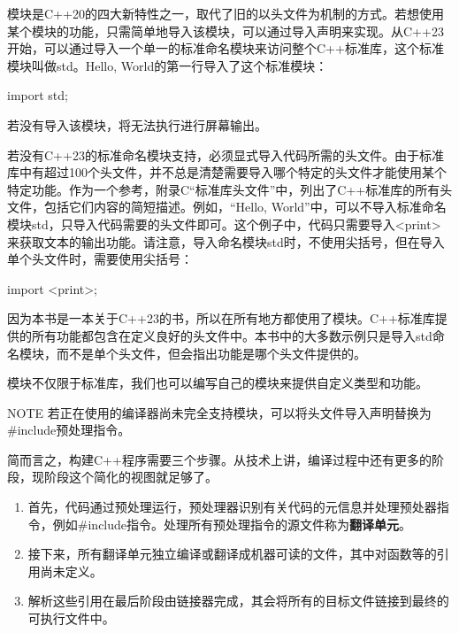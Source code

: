 
模块是C++20的四大新特性之一，取代了旧的以头文件为机制的方式。若想使用某个模块的功能，只需简单地导入该模块，可以通过导入声明来实现。从C++23开始，可以通过导入一个单一的标准命名模块来访问整个C++标准库，这个标准模块叫做std。Hello, World的第一行导入了这个标准模块：

\begin{cpp}
import std;
\end{cpp}

若没有导入该模块，将无法执行进行屏幕输出。

若没有C++23的标准命名模块支持，必须显式导入代码所需的头文件。由于标准库中有超过100个头文件，并不总是清楚需要导入哪个特定的头文件才能使用某个特定功能。作为一个参考，附录C“标准库头文件”中，列出了C++标准库的所有头文件，包括它们内容的简短描述。例如，“Hello, World”中，可以不导入标准命名模块std，只导入代码需要的头文件即可。这个例子中，代码只需要导入<print>来获取文本的输出功能。请注意，导入命名模块std时，不使用尖括号，但在导入单个头文件时，需要使用尖括号：

\begin{cpp}
import <print>;
\end{cpp}

因为本书是一本关于C++23的书，所以在所有地方都使用了模块。C++标准库提供的所有功能都包含在定义良好的头文件中。本书中的大多数示例只是导入std命名模块，而不是单个头文件，但会指出功能是哪个头文件提供的。

模块不仅限于标准库，我们也可以编写自己的模块来提供自定义类型和功能。

\begin{myNotic}{NOTE}
若正在使用的编译器尚未完全支持模块，可以将头文件导入声明替换为\#include预处理指令。
\end{myNotic}


简而言之，构建C++程序需要三个步骤。从技术上讲，编译过程中还有更多的阶段，现阶段这个简化的视图就足够了。

\begin{enumerate}
\item
首先，代码通过预处理运行，预处理器识别有关代码的元信息并处理预处器指令，例如\#include指令。处理所有预处理指令的源文件称为\textbf{翻译单元}。

\item
接下来，所有翻译单元独立编译或翻译成机器可读的文件，其中对函数等的引用尚未定义。

\item
解析这些引用在最后阶段由链接器完成，其会将所有的目标文件链接到最终的可执行文件中。
\end{enumerate}

